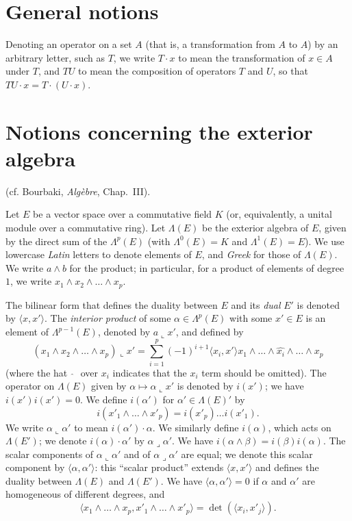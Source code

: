 \documentclass{article}
\newcommand{\llp}{\mathbin{\llcorner}}
\newcommand{\lrp}{\mathbin{\lrcorner}}
\newcommand{\oldpage}[1]{\marginpar{\footnotesize$\Big\vert$ \textit{p.~#1}}}
\begin{document}
\section{General notions}
\label{I.1}

Denoting an operator on a set $A$ (that is, a transformation from $A$ to $A$) by an arbitrary letter, such as $T$, we write $T\cdot x$ to mean the transformation of $x\in A$ under $T$, and $TU$ to mean the composition of operators $T$ and $U$, so that $TU\cdot x = T\cdot (U\cdot x)$.


\section{Notions concerning the exterior algebra}
\label{I.2}

{(cf. {\sc Bourbaki}, \emph{Alg\`{e}bre}, Chap.~III).}

Let $E$ be a vector space over a commutative field $K$ (or, equivalently, a unital module over a commutative ring).
Let $\Lambda(E)$ be the exterior algebra of $E$, given by the direct sum of the $\Lambda^p(E)$ (with $\Lambda^0(E)=K$ and $\Lambda^1(E)=E$).
We use lowercase \emph{Latin} letters to denote elements of $E$, and \emph{Greek} for those of $\Lambda(E)$.
We write $a\wedge b$ for the product;
in particular, for a product of elements of degree~$1$, we write $x_1\wedge x_2\wedge\ldots\wedge x_p$.

The bilinear form that defines the duality between $E$ and its \emph{dual} $E'$ is denoted by $\langle x,x'\rangle$.
The \emph{interior product} of some $\alpha\in\Lambda^p(E)$ with some $x'\in E$ is an element of $\Lambda^{p-1}(E)$, denoted by $a\llp x'$, and defined by
\[
  (x_1\wedge x_2\wedge\ldots\wedge x_p) \llp x'
  = \sum_{i=1}^p (-1)^{i+1} \langle x_i,x' \rangle x_1\wedge\ldots\wedge\widehat{x_i}\wedge\ldots\wedge x_p
\]
(where the hat $\;\widehat{\,}\;$ over $x_i$ indicates that the $x_i$ term should be omitted).
The operator on $\Lambda(E)$ given by $\alpha\mapsto\alpha\llp x'$ is denoted by $i(x')$;
we have $i(x')i(x')=0$.
We define $i(\alpha')$ for $\alpha'\in\Lambda(E)'$ by
\[
  i(x'_1\wedge\ldots\wedge x'_p)
  = i(x'_p)\ldots i(x'_1).
\]
We write
\oldpage{8}
$\alpha\llp\alpha'$ to mean $i(\alpha')\cdot\alpha$.
We similarly define $i(\alpha)$, which acts on $\Lambda(E')$;
we denote $i(\alpha)\cdot\alpha'$ by $\alpha\lrp\alpha'$.
We have $i(\alpha\wedge\beta)=i(\beta)i(\alpha)$.
The scalar components of $\alpha\llp\alpha'$ and of $\alpha\lrp\alpha'$ are equal;
we denote this scalar component by $\langle\alpha,\alpha'\rangle$: this ``scalar product'' extends $\langle x,x'\rangle$ and defines the duality between $\Lambda(E)$ and $\Lambda(E')$.
We have $\langle\alpha,\alpha'\rangle=0$ if $\alpha$ and $\alpha'$ are homogeneous of different degrees, and
\[
  \langle x_1\wedge\ldots\wedge x_p,x'_1\wedge\ldots\wedge x'_p\rangle = \det(\langle x_i,x'_j\rangle).
\]
\end{document}
